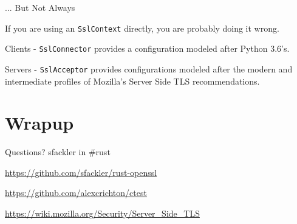 \documentclass{beamer}
\begin{document}
\begin{frame}[fragile]{... But Not Always}
    \begin{center}
        \Large If you are using an \verb!SslContext! directly, you are probably
        doing it wrong.
    \end{center}

    \pause

    Clients - \verb!SslConnector! provides a configuration modeled after Python
    3.6's.

    Servers - \verb!SslAcceptor! provides configurations modeled after the
    modern and intermediate profiles of Mozilla's Server Side TLS
    recommendations.
\end{frame}

\section{Wrapup}

\begin{frame}{Questions?}
    sfackler in \#rust

    \url{https://github.com/sfackler/rust-openssl}

    \url{https://github.com/alexcrichton/ctest}

    \url{https://wiki.mozilla.org/Security/Server_Side_TLS}
\end{frame}
\end{document}
